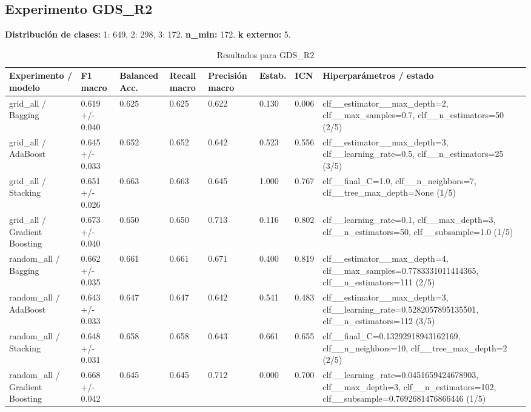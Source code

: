 \documentclass{article}
\begin{document}
\subsection*{Experimento GDS\_R2}
\noindent\textbf{Distribuci\'on de clases:} 1: 649, 2: 298, 3: 172. \textbf{n\_min:} 172. \textbf{k externo:} 5.
\begin{table}[h]
\centering
\caption{Resultados para GDS\_R2}
\scriptsize
\begin{tabular}{p{3.2cm}p{2.0cm}p{1.6cm}p{1.6cm}p{1.8cm}p{1.5cm}p{1.4cm}p{3.4cm}}
\toprule
Experimento / modelo & F1 macro & Balanced Acc. & Recall macro & Precisi\'on macro & Estab. & ICN & Hiperpar\'ametros / estado \\
\midrule
grid\_all / Bagging & 0.619 +/- 0.040 & 0.625 & 0.625 & 0.622 & 0.130 & 0.006 & clf\_\_estimator\_\_max\_depth=2, clf\_\_max\_samples=0.7, clf\_\_n\_estimators=50 (2/5) \\
grid\_all / AdaBoost & 0.645 +/- 0.033 & 0.652 & 0.652 & 0.642 & 0.523 & 0.556 & clf\_\_estimator\_\_max\_depth=3, clf\_\_learning\_rate=0.5, clf\_\_n\_estimators=25 (3/5) \\
grid\_all / Stacking & 0.651 +/- 0.026 & 0.663 & 0.663 & 0.645 & 1.000 & 0.767 & clf\_\_final\_C=1.0, clf\_\_n\_neighbors=7, clf\_\_tree\_max\_depth=None (1/5) \\
grid\_all / Gradient Boosting & 0.673 +/- 0.040 & 0.650 & 0.650 & 0.713 & 0.116 & 0.802 & clf\_\_learning\_rate=0.1, clf\_\_max\_depth=3, clf\_\_n\_estimators=50, clf\_\_subsample=1.0 (1/5) \\
random\_all / Bagging & 0.662 +/- 0.035 & 0.661 & 0.661 & 0.671 & 0.400 & 0.819 & clf\_\_estimator\_\_max\_depth=4, clf\_\_max\_samples=0.7783331011414365, clf\_\_n\_estimators=111 (2/5) \\
random\_all / AdaBoost & 0.643 +/- 0.033 & 0.647 & 0.647 & 0.642 & 0.541 & 0.483 & clf\_\_estimator\_\_max\_depth=3, clf\_\_learning\_rate=0.5282057895135501, clf\_\_n\_estimators=112 (3/5) \\
random\_all / Stacking & 0.648 +/- 0.031 & 0.658 & 0.658 & 0.643 & 0.661 & 0.655 & clf\_\_final\_C=0.13292918943162169, clf\_\_n\_neighbors=10, clf\_\_tree\_max\_depth=2 (2/5) \\
random\_all / Gradient Boosting & 0.668 +/- 0.042 & 0.645 & 0.645 & 0.712 & 0.000 & 0.700 & clf\_\_learning\_rate=0.0451659424678903, clf\_\_max\_depth=3, clf\_\_n\_estimators=102, clf\_\_subsample=0.7692681476866446 (1/5) \\
\bottomrule
\end{tabular}
\end{table}
\end{document}
